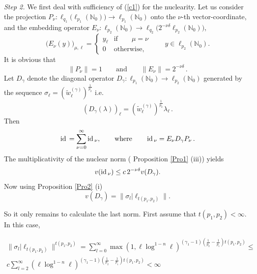 \documentclass[12pt]{article}
\def\id{\mathop{\rm id \,}\nolimits}
\newcommand{\N}{{\mathbb N}}
\begin{document}
{\em Step 2.}  We first deal with sufficiency of  (\ref{c1}) for the nuclearity.
Let us consider the projection 
$P_\nu: \ell_{q_1}\big(\ell_{p_1}(\N_0)\big) \rightarrow \ell_{p_1}(\N_0)$
onto the $\nu$-th vector-coordinate,  and  the embedding operator $E_\nu: \ell_{p_2}(\N_0) \rightarrow \ell_{q_2}\big(2^{-\nu \delta} \ell_{p_2}(\N_0)\big)$, 
\[
\big(E_\nu(y)\big)_{\mu, \ell}= \begin{cases}
y_\ell & \text{if}\qquad  \mu = \nu\\
0 & \text{otherwise}, 
\end{cases}
\qquad y \in  \ell_{p_2}(\N_0).
\]
It is  obvious that 
\begin{equation}\nonumber
\|P_\nu\| = 1 \qquad \text{and}\qquad \|E_\nu\| = 2^{-\nu\delta}\, .
\end{equation}
Let $D_\gamma$ denote the diagonal operator $D_\gamma: \ell_{p_1}(\N_0) \rightarrow \ell_{p_2}(\N_0)$ generated by the sequence
$\sigma_\ell =  (\widetilde{w}_\ell^{(\gamma)})^{\frac{1}{p_2}}$ i.e. 
\begin{equation}
(D_\gamma(\lambda))_\ell = (\widetilde{w}^{(\gamma)}_\ell)^{\frac{1}{p_2}} \lambda_\ell\, .
\label{D}
\end{equation}
Then
\begin{equation}
\id = \sum_{\nu=0}^\infty \id_\nu, \qquad \text{where} \qquad
\id_\nu=E_\nu D_\gamma P_\nu \,.
\label{v1.1}
\end{equation}
The multiplicativity of the nuclear norm ( Proposition \ref{Pro1} (iii)) yields
\begin{equation}
v(\id_\nu) \leq c \,2^{-\nu\delta} v(D_\gamma).
\label{v1.2}
\end{equation}
Now using  Proposition \ref{Pro2} (i)
 \begin{equation}
v(D_\gamma)= \|\sigma_l |\ell_{t(p_1,p_2)}\|.
\label{v1.3}
\end{equation}

So it only remains to calculate the last norm. First assume that $t(p_1,p_2)<\infty$. In this case,

\begin{align}
\nonumber
 \|\sigma_l |\ell_{t(p_1,p_2)}\|^{t(p_1,p_2)}=\sum_{l=0}^\infty \max(1,\ell\log^{1-n}\ell)^{(\gamma_1-1)(\frac{1}{p_2}-\frac{1}{p_1})t(p_1,p_2)}\leq \\ c \sum_{l=2}^\infty (\ell\log^{1-n}\ell)^{(\gamma_1-1)(\frac{1}{p_2}-\frac{1}{p_1})t(p_1,p_2)}<\infty
 \label{v1.4}
\end{align}
\end{document}
